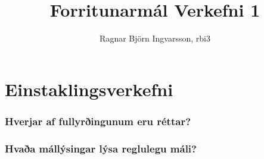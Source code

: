 \documentclass[leqno]{article}
\title{Forritunarmál Verkefni 1}
\author{Ragnar Björn Ingvarsson, rbi3}
\begin{document}
	
	\maketitle


		\part{Einstaklingsverkefni}
		\setcounter{section}{0}
		\section{Hverjar af fullyrðingunum eru réttar?}

		\section{Hvaða mállýsingar lýsa reglulegu máli?}

\vspace{2em}
\end{document}
